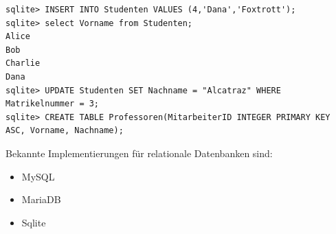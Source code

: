 \documentclass[titlepage]{report}
\begin{document}
\begin{minipage}{\linewidth}
\begin{lstlisting}[caption={Verwendung von Structured Query Language},label={lst:sqlexample}]
sqlite> INSERT INTO Studenten VALUES (4,'Dana','Foxtrott');
sqlite> select Vorname from Studenten;
Alice
Bob
Charlie
Dana
sqlite> UPDATE Studenten SET Nachname = "Alcatraz" WHERE Matrikelnummer = 3;
sqlite> CREATE TABLE Professoren(MitarbeiterID INTEGER PRIMARY KEY ASC, Vorname, Nachname);
\end{lstlisting}
\end{minipage}
Bekannte Implementierungen für relationale Datenbanken sind:
\begin{itemize}
    \item MySQL
    \item MariaDB
    \item Sqlite
\end{itemize}
\end{document}
